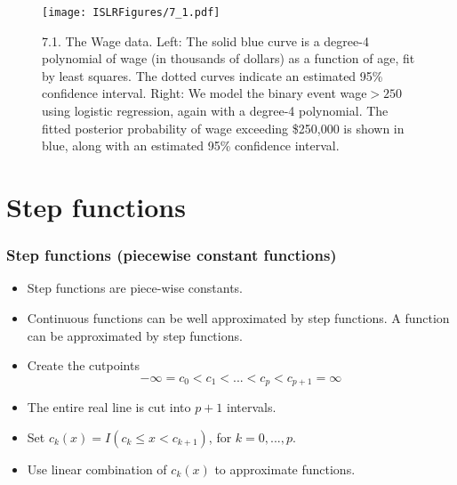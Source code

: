 \documentclass{beamer}
\begin{document}
           \begin{frame}
           	\frametitle{ }
           	\begin{figure}
           		\centering
           		 
           			\centering
           			\texttt{[image: ISLRFigures/7\_1.pdf]}
           		\caption{\scriptsize 7.1. The Wage data. Left: The solid blue curve is a degree-4 polynomial
           			of wage (in thousands of dollars) as a function of age, fit by least squares. The
           			dotted curves indicate an estimated 95\% confidence interval. Right: We model the
           			binary event wage$>250$ using logistic regression, again with a degree-4 polynomial.
           			The fitted posterior probability of wage exceeding \$250,000 is shown in blue, along
           			with an estimated 95\% confidence interval.
           		}
           	\end{figure}
           \end{frame}
           
\section{Step functions}

  \begin{frame}
    \frametitle{ Step functions (piecewise constant functions)}
    \begin{itemize}
       \item Step functions are piece-wise constants.
       \item Continuous functions can be well approximated by step functions.
       A function can be approximated by step functions.
        \item  Create the cutpoints 
        $$-\infty = c_0 < c_1< ...< c_p < c_{p+1}=\infty$$  
       \item The entire real line is cut into $p+1$ intervals.
       \item Set $c_k(x) = I(c_k \leq x < c_{k+1})$, for $k=0, ..., p$.  
       \item Use linear combination of $c_k(x)$ to approximate functions.	
              		
    \end{itemize}
  \end{frame} 
  
\end{document}
